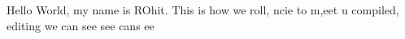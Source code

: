 \documentclass{article}
\begin{document}
Hello World, my name is ROhit. This is how we roll, ncie to m,eet u compiled, editing we can see see cans ee
\end{document}
